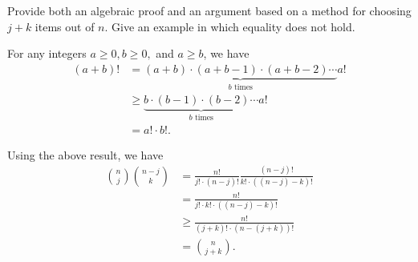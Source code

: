 \documentclass{report}
\makeatletter
\renewenvironment{framed}{%
 \def\FrameCommand##1{\hskip\@totalleftmargin
 \fboxsep=\FrameSep\fbox{##1}}%
 \MakeFramed {\advance\hsize-\width
   \@totalleftmargin\z@ \linewidth\hsize
   \@setminipage}}%
 {\par\unskip\endMakeFramed}
\makeatother
\begin{document}
\begin{enumerate}
{Provide both an algebraic proof and an argument based on a method for choosing
$j + k$ items out of $n$. Give an example in which equality does not hold.
}

\begin{framed}
For any integers $a \ge 0, b \ge 0,$ and $a \ge b$, we have
\begin{equation*}
\begin{aligned}
  (a + b)! &=   \underbrace{(a + b) \cdot (a + b - 1) \cdot (a + b - 2) \cdots}_\text{$b$ times} a!\\
           &\ge \underbrace{b \cdot (b - 1) \cdot (b - 2) \cdots}_\text{$b$ times} a!\\
           &=   a! \cdot b!.
\end{aligned}
\end{equation*}

Using the above result, we have
\begin{equation*}
\begin{aligned}
  \binom{n}{j} \binom{n - j}{k} &=   \frac{n!}{j! \cdot (n - j)!} \frac{(n - j)!}{k! \cdot ((n - j) - k)!}\\
                                &=   \frac{n!}{j! \cdot k! \cdot ((n - j) - k)!}\\
                                &\ge \frac{n!}{(j + k)! \cdot (n - (j + k))!}\\
                                &=   \binom{n}{j + k}.
\end{aligned}
\end{equation*}


\end{framed}
\end{enumerate}
\end{document}
